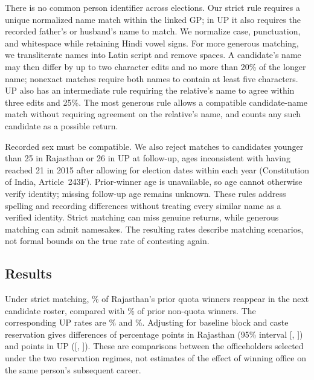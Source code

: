 There is no common person identifier across elections. Our strict rule requires a unique normalized name match within the linked GP; in UP it also requires the recorded father's or husband's name to match. We normalize case, punctuation, and whitespace while retaining Hindi vowel signs. For more generous matching, we transliterate names into Latin script and remove spaces. A candidate's name may then differ by up to two character edits and no more than 20\% of the longer name; nonexact matches require both names to contain at least five characters. UP also has an intermediate rule requiring the relative's name to agree within three edits and 25\%. The most generous rule allows a compatible candidate-name match without requiring agreement on the relative's name, and counts any such candidate as a possible return.

Recorded sex must be compatible. We also reject matches to candidates younger than 25 in Rajasthan or 26 in UP at follow-up, ages inconsistent with having reached 21 in 2015 after allowing for election dates within each year (Constitution of India, Article~243F). Prior-winner age is unavailable, so age cannot otherwise verify identity; missing follow-up age remains unknown. These rules address spelling and recording differences without treating every similar name as a verified identity. Strict matching can miss genuine returns, while generous matching can admit namesakes. The resulting rates describe matching scenarios, not formal bounds on the true rate of contesting again.

\subsection{Results}

Under strict matching, \recontestRajQuotaRate{}\% of Rajasthan's prior quota winners reappear in the next candidate roster, compared with \recontestRajNonquotaRate{}\% of prior non-quota winners. The corresponding UP rates are \recontestUpQuotaRate{}\% and \recontestUpNonquotaRate{}\%. Adjusting for baseline block and caste reservation gives differences of \recontestRajDifference{} percentage points in Rajasthan (95\% interval [\recontestRajLow{}, \recontestRajHigh{}]) and \recontestUpDifference{} points in UP ([\recontestUpLow{}, \recontestUpHigh{}]). These are comparisons between the officeholders selected under the two reservation regimes, not estimates of the effect of winning office on the same person's subsequent career.

